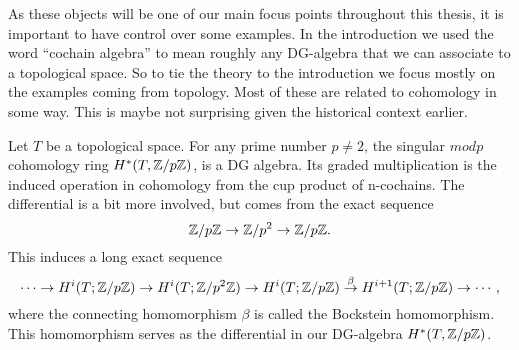 

As these objects will be one of our main focus points throughout this thesis, it is important to have control over some examples. In the introduction we used the word ``cochain algebra'' to mean roughly any DG-algebra that we can associate to a topological space. So to tie the theory to the introduction we focus mostly on the examples coming from topology. Most of these are related to cohomology in some way. This is maybe not surprising given the historical context earlier. 

\begin{example}
\label{ex:singular_p_cohomology}
Let $T$ be a topological space. For any prime number $p\neq 2$, the singular $mod p$ cohomology ring $H^*(T, \mathbb{Z}/p\mathbb{Z})$, is a DG algebra. Its graded multiplication is the induced operation in cohomology from the cup product of n-cochains. The differential is a bit more involved, but comes from the exact sequence
\begin{equation*}
\mathbb{Z}/p\mathbb{Z} \rightarrow \mathbb{Z}/p^2 \rightarrow \mathbb{Z}/p\mathbb{Z}.
\end{equation*}    
This induces a long exact sequence 
\begin{equation*}
    \cdots \rightarrow H^i(T; \mathbb{Z}/p\mathbb{Z}) \rightarrow H^i(T; \mathbb{Z}/p^2\mathbb{Z}) \rightarrow H^i(T; \mathbb{Z}/p\mathbb{Z}) \overset{\beta}\rightarrow H^{i+1}(T; \mathbb{Z}/p\mathbb{Z}) \rightarrow \cdots, 
\end{equation*}
where the connecting homomorphism $\beta$ is called the Bockstein homomorphism. This homomorphism serves as the differential in our DG-algebra $H^*(T, \mathbb{Z}/p\mathbb{Z})$. 
\end{example}


